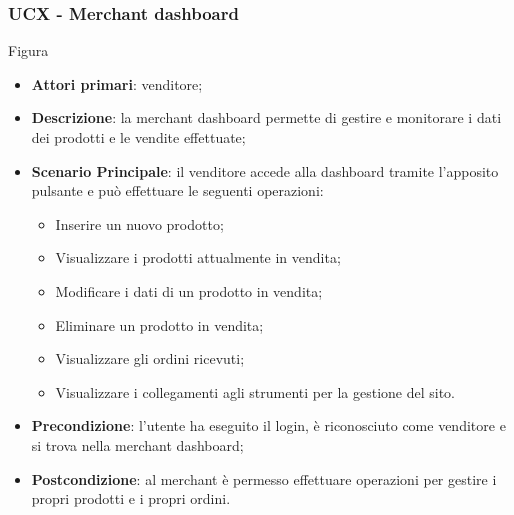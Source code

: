 \subsubsection{UCX - Merchant dashboard}
Figura \\
\begin{itemize}
\item \textbf{Attori primari}: venditore;
\item \textbf{Descrizione}: la merchant dashboard permette di gestire e monitorare i dati dei prodotti e le vendite effettuate;
\item \textbf{Scenario Principale}: il venditore accede alla dashboard tramite l'apposito pulsante e può effettuare le seguenti operazioni:
\begin{itemize}
	\item Inserire un nuovo prodotto;
	\item Visualizzare i prodotti attualmente in vendita;
	\item Modificare i dati di un prodotto in vendita;
	\item Eliminare un prodotto in vendita;
	\item Visualizzare gli ordini ricevuti;
	\item Visualizzare i collegamenti agli strumenti per la gestione del sito.
\end{itemize}
\item \textbf{Precondizione}: l'utente ha eseguito il login, è riconosciuto come venditore e si trova nella merchant dashboard;
\item \textbf{Postcondizione}: al merchant è permesso effettuare operazioni   per gestire i propri prodotti e i propri ordini.
\end{itemize}

